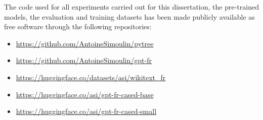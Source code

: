 The code used for all experiments carried out for this dissertation, the pre-trained models, the evaluation and training datasets has been made publicly available as free software through the following repositories:

\begin{itemize}
    \item \url{https://github.com/AntoineSimoulin/pytree}
    \item \url{https://github.com/AntoineSimoulin/gpt-fr}
    \item \url{https://huggingface.co/datasets/asi/wikitext_fr}
    \item \url{https://huggingface.co/asi/gpt-fr-cased-base}
    \item \url{https://huggingface.co/asi/gpt-fr-cased-small}
\end{itemize}
